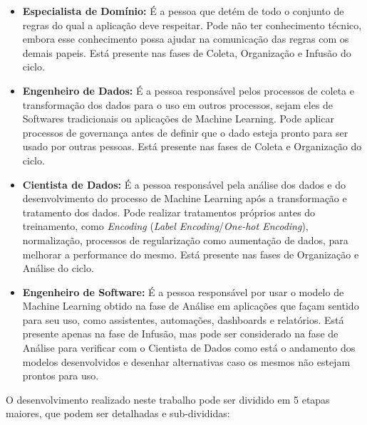 \documentclass[portugues]{ic-tese}
\begin{document}
\begin{itemize}
\item \textbf{Especialista de Domínio:} É a pessoa que detém de todo o conjunto de regras do qual a aplicação deve respeitar. Pode não ter conhecimento técnico, embora esse conhecimento possa ajudar na comunicação das regras com os demais papeis. Está presente nas fases de Coleta, Organização e Infusão do ciclo.

\item \textbf{Engenheiro de Dados:} É a pessoa responsável pelos processos de coleta e transformação dos dados para o uso em outros processos, sejam eles de Softwares tradicionais ou aplicações de Machine Learning. Pode aplicar processos de governança antes de definir que o dado esteja pronto para ser usado por outras pessoas. Está presente nas fases de Coleta e Organização do ciclo.

\item \textbf{Cientista de Dados:} É a pessoa responsável pela análise dos dados e do desenvolvimento do processo de Machine Learning após a transformação e tratamento dos dados. Pode realizar tratamentos próprios antes do treinamento, como \textit{Encoding} (\textit{Label Encoding}/\textit{One-hot Encoding}), normalização, processos de regularização como aumentação de dados, para melhorar a performance do mesmo. Está presente nas fases de Organização e Análise do ciclo.

\item \textbf{Engenheiro de Software:} É a pessoa responsável por usar o modelo de Machine Learning obtido na fase de Análise em aplicações que façam sentido para seu uso, como assistentes, automações, dashboards e relatórios. Está presente apenas na fase de Infusão, mas pode ser considerado na fase de Análise para verificar com o Cientista de Dados como está o andamento dos modelos desenvolvidos e desenhar alternativas caso os mesmos não estejam prontos para uso.

\end{itemize}

O desenvolvimento realizado neste trabalho pode ser dividido em 5 etapas maiores, que podem ser detalhadas e sub-divididas:
\end{document}
